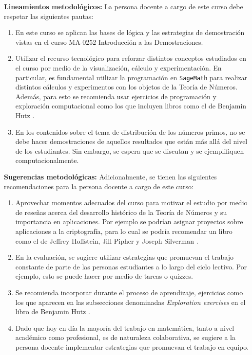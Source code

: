 \begin{refsection}
\noindent \textbf{Lineamientos metodológicos:} La persona docente a cargo de este curso debe respetar las siguientes pautas:
\begin{enumerate}
    \item En este curso se aplican las bases de lógica y las estrategias de demostración vistas en el curso MA-0252 Introducción a las Demostraciones.
   \item Utilizar el recurso tecnológico para reforzar distintos conceptos estudiados en el curso por medio de la visualización, cálculo y experimentación. En particular, es fundamental utilizar la programación en \texttt{SageMath} para realizar distintos cálculos y experimentos con los objetos de la Teoría de Números. Además, para esto se recomienda usar ejercicios de programación y exploración computacional como los que incluyen libros como el de Benjamin Hutz \cite{Hut18}.
   \item En los contenidos sobre el tema de distribución de los números primos, no se debe hacer demostraciones de aquellos resultados que están más allá del nivel de los estudiantes. Sin embargo, se espera que se discutan y se ejemplifiquen computacionalmente.
\end{enumerate}

\textbf{Sugerencias metodológicas:} Adicionalmente, se tienen las siguientes recomendaciones para la persona docente a cargo de este curso:
\begin{enumerate}
    \item Aprovechar momentos adecuados del curso para motivar el estudio por medio de reseñas acerca del desarrollo histórico de la Teoría de Números y su importancia en aplicaciones. Por ejemplo se podrían asignar proyectos sobre aplicaciones a la criptografía, para lo cual se podría recomendar un libro como el de Jeffrey Hoffstein, Jill Pipher y Joseph Silverman \cite{HPS14}.
    \item En la evaluación, se sugiere utilizar estrategias que promuevan el trabajo constante de parte de las personas estudiantes a lo largo del ciclo lectivo. Por ejemplo, esto se puede hacer por medio de tareas o quizzes.
    \item Se recomienda incorporar durante el proceso de aprendizaje, ejercicios como los que aparecen en las subsecciones denominadas \textit{Exploration exercises} en el libro de Benjamin Hutz \cite{Hut18}.
    \item Dado que hoy en día la mayoría del trabajo en matemática, tanto a nivel académico como profesional, es de naturaleza colaborativa, se sugiere a la persona docente implementar estrategias que promuevan el trabajo en equipo.
\end{enumerate}




\end{refsection}
